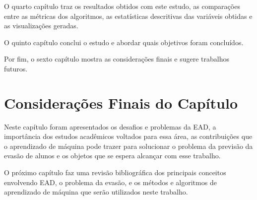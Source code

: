 O quarto capítulo traz os resultados obtidos com este estudo, as comparações
entre as métricas dos algoritmos, as estatísticas descritivas das variáveis
obtidas e as visualizações geradas.

O quinto capítulo conclui o estudo e abordar quais objetivos foram concluídos.

Por fim, o sexto capítulo mostra as considerações finais e sugere trabalhos
futuros.

\section{Considerações Finais do Capítulo}

Neste capítulo foram apresentados os desafios e problemas da EAD, a importância
dos estudos acadêmicos voltados para essa área, as contribuições que o
aprendizado de máquina pode trazer para solucionar o problema da previsão da
evasão de alunos e os objetos que se espera alcançar com esse trabalho.

O próximo capítulo faz uma revisão bibliográfica dos principais conceitos
envolvendo EAD, o problema da evasão, e os métodos e algoritmos de aprendizado
de máquina que serão utilizados neste trabalho.
